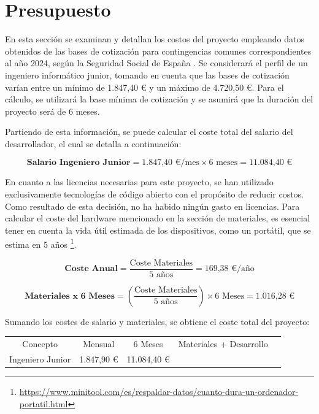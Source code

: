 \section{Presupuesto}

En esta sección se examinan y detallan los costos del proyecto empleando datos obtenidos de las bases de cotización para contingencias comunes correspondientes al año 2024, según la Seguridad Social de España \cite{seg-social}. Se considerará el perfil de un ingeniero informático junior, tomando en cuenta que las bases de cotización varían entre un mínimo de 1.847,40 € y un máximo de 4.720,50 €. Para el cálculo, se utilizará la base mínima de cotización y se asumirá que la duración del proyecto será de 6 meses.\newline

Partiendo de esta información, se puede calcular el coste total del salario del desarrollador, el cual se detalla a continuación:

\begin{equation}
    \textbf{Salario Ingeniero Junior} = \text{1.847,40 €/mes} \times 6 \text{ meses} = \text{11.084,40 €}
\end{equation}

En cuanto a las licencias necesarias para este proyecto, se han utilizado exclusivamente tecnologías de código abierto con el propósito de reducir costos. Como resultado de esta decisión, no ha habido ningún gasto en licencias. Para calcular el coste del hardware mencionado en la sección de materiales, es esencial tener en cuenta la vida útil estimada de los dispositivos, como un portátil, que se estima en 5 años \footnote{\url{https://www.minitool.com/es/respaldar-datos/cuanto-dura-un-ordenador-portatil.html}}.

\begin{equation}
    \textbf{Coste Anual} = \frac {\text{Coste Materiales}}{\text{5 años}} = \text{169,38 €/año}
\end{equation}

\begin{equation}
    \textbf{Materiales x 6 Meses} = \left(\frac {\text{Coste Materiales}}{\text{5 años}}\right) \times 6 \text{ Meses} = \text{1.016,28 €}
\end{equation}

Sumando los costes de salario y materiales, se obtiene el coste total del proyecto:

\begin{table}[H]
    \begin{tabular}{|c|c|c|l|l}
    \cline{1-4}
    Concepto         & Mensual    & 6 Meses     & \multicolumn{1}{c|}{Materiales + Desarrollo} &  \\ \cline{1-4}
    Ingeniero Junior & 1.847,90 € & 11.084,40 € &                                              &  \\ \cline{1-4}
    \end{tabular}
\end{table}